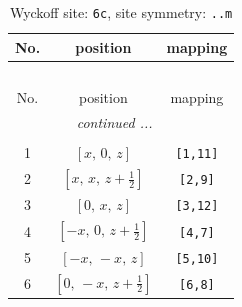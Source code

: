 \documentclass[fleqn,8pt]{jsarticle}
\begin{document}
\renewcommand{\arraystretch}{1.2}
\begin{longtable}{ccc}
\caption{Wyckoff site: {\tt 6c}, site symmetry: {\tt ..m}}
 \\
 \hline \hline
No. & position & mapping \\ \hline \endfirsthead

\multicolumn{2}{l}{\tablename\ \thetable{}} \\
 \hline \hline
No. & position & mapping \\ \hline \endhead

 \hline \hline
\multicolumn{2}{r}{\footnotesize\it continued ...} \\ \endfoot

 \hline \hline
\multicolumn{2}{r}{} \\ \endlastfoot

1 & $\left[ x,\, 0,\, z \right]$ & {\tt [1,11]} \\ \hline
2 & $\left[ x,\, x,\, z + \frac{1}{2} \right]$ & {\tt [2,9]} \\ \hline
3 & $\left[ 0,\, x,\, z \right]$ & {\tt [3,12]} \\ \hline
4 & $\left[ - x,\, 0,\, z + \frac{1}{2} \right]$ & {\tt [4,7]} \\ \hline
5 & $\left[ - x,\, - x,\, z \right]$ & {\tt [5,10]} \\ \hline
6 & $\left[ 0,\, - x,\, z + \frac{1}{2} \right]$ & {\tt [6,8]} \\
\end{longtable}
\renewcommand{\arraystretch}{1.2}
\end{document}
